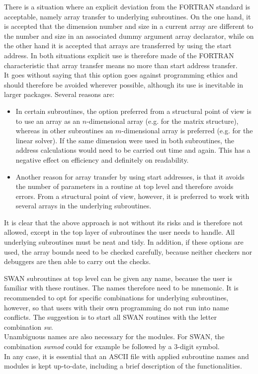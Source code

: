 \documentclass[12pt]{book}
\begin{document}
 \label{ch:excep}

There is a situation where an explicit deviation from the FORTRAN standard is acceptable, namely array
transfer to underlying subroutines. On the one hand, it is accepted that the dimension number and
size in a current array are different to the number and size in an associated dummy argument array
declarator, while on the other hand it is accepted that arrays are transferred by using the start
address. In both situations explicit use is therefore made of the FORTRAN characteristic that array
transfer means no more than start address transfer.
\\[2ex]
\noindent
It goes without saying that this option goes against programming ethics and should therefore be
avoided wherever possible, although its use is inevitable in larger packages. Several reasons are:
\begin{itemize}
  \item In certain subroutines, the option preferred from a structural point of view is to use an array as
        an $n$-dimensional array (e.g. for the matrix structure), whereas in other subroutines an $m$-dimensional
        array is preferred (e.g. for the linear solver). If the same dimension were used in both subroutines,
        the address calculations would need to be carried out time and again. This has a negative effect on
        efficiency and definitely on readability.
  \item Another reason for array transfer by using start addresses, is that it avoids the number of parameters
        in a routine at top level and therefore avoids errors. From a structural point of view, however, it is
        preferred to work with several arrays in the underlying subroutines.
\end{itemize}
It is clear that the above approach is not without its risks and is therefore not allowed, except in
the top layer of subroutines the user needs to handle. All underlying subroutines must be neat and tidy.
In addition, if these options are used, the array bounds need to be checked carefully, because neither
checkers nor debuggers are then able to carry out the checks.

 \label{ch:name}

SWAN subroutines at top level can be given any name, because the user is familiar with these routines.
The names therefore need to be mnemonic. It is recommended to opt for specific combinations for
underlying subroutines, however, so that users with their own programming do not run into name
conflicts. The suggestion is to start all SWAN routines with the letter combination \textit{sw}.
\\[2ex]
\noindent
Unambiguous names are also necessary for the modules. For SWAN, the combination \textit{swmod} could for example
be followed by a 3-digit symbol.
\\[2ex]
\noindent
In any case, it is essential that an ASCII file with applied subroutine
names and modules is kept up-to-date, including a brief description of the functionalities.
\end{document}
